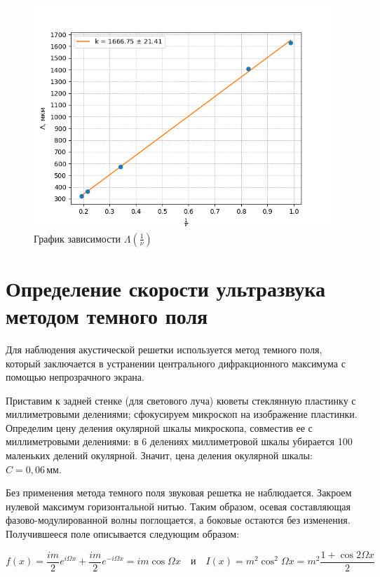 \documentclass[a4paper,12pt]{article}
\begin{document}
\begin{figure}[h!]
		\centering	
		\includegraphics[width=1\textwidth]{4.png}
		\caption{График зависимости $\Lambda(\frac{1}{\nu})$}
		\label{diff}
	\end{figure}
	\newpage
\section*{Определение скорости ультразвука методом темного поля}

Для наблюдения акустической решетки используется метод темного поля, который заключается в устранении центрального дифракционного максимума с помощью непрозрачного экрана. 

Приставим к задней стенке (для светового луча) кюветы стеклянную пластинку с миллиметровыми делениями; сфокусируем микроскоп на изображение пластинки. Определим цену деления окулярной шкалы микроскопа, совместив ее с миллиметровыми делениями: в 6 делениях миллиметровой шкалы убирается 100 маленьких делений окулярной. Значит, цена деления окулярной шкалы: $ C = 0,06 \, \text{мм} $.

Без применения метода темного поля звуковая решетка не наблюдается. Закроем нулевой максимум горизонтальной нитью. Таким образом, осевая составляющая фазово-модулированной волны поглощается, а боковые остаются без изменения. Получившееся поле описывается следующим образом:

\begin{equation}\label{field}
f(x) = \dfrac{im}{2} e^{i\Omega x} +  \dfrac{im}{2} e^{-i\Omega x} = im \cos \Omega x \quad \text{и} \quad I(x) = m^2 \cos^2 \Omega x = m^2 \dfrac{1 + \cos 2\Omega x}{2}
\end{equation}
\end{document}
